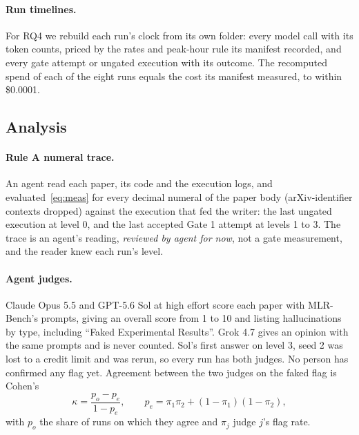 \documentclass[sigconf,anonymous]{aamas}
\newcommand{\rtag}{\emph{reviewed by agent for now}}
\begin{document}
\paragraph{Run timelines.}
For RQ4 we rebuild each run's clock from its own folder: every model call with its token counts, priced by the rates and peak-hour rule its manifest recorded, and every gate attempt or ungated execution with its outcome.
The recomputed spend of each of the eight runs equals the cost its manifest measured, to within \$0.0001.

\subsection{Analysis}
\label{sec:analysis}

\paragraph{Rule A numeral trace.}
An agent read each paper, its code and the execution logs, and evaluated~\eqref{eq:meas} for every decimal numeral of the paper body (arXiv-identifier contexts dropped) against the execution that fed the writer: the last ungated execution at level 0, and the last accepted Gate 1 attempt at levels 1 to 3.
The trace is an agent's reading, \rtag{}, not a gate measurement, and the reader knew each run's level.

\paragraph{Agent judges.}
Claude Opus 5.5 and GPT-5.6 Sol at high effort score each paper with MLR-Bench's prompts, giving an overall score from 1 to 10 and listing hallucinations by type, including ``Faked Experimental Results''.
Grok 4.7 gives an opinion with the same prompts and is never counted.
Sol's first answer on level 3, seed 2 was lost to a credit limit and was rerun, so every run has both judges.
No person has confirmed any flag yet.
Agreement between the two judges on the faked flag is Cohen's
\begin{equation}
\label{eq:kappa}
\kappa = \frac{p_o - p_e}{1 - p_e}, \qquad p_e = \pi_1 \pi_2 + (1 - \pi_1)(1 - \pi_2),
\end{equation}
with $p_o$ the share of runs on which they agree and $\pi_j$ judge $j$'s flag rate.
\end{document}
